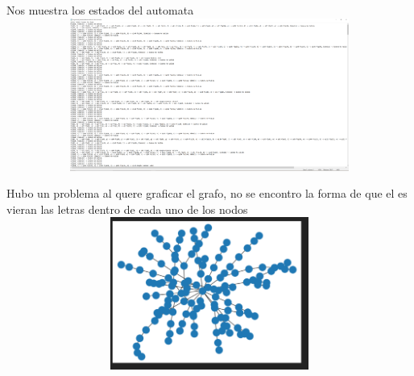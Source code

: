 \documentclass{article}
\begin{document}
\begin{flushleft}
Nos muestra los estados del automata
\includegraphics[width= 15cm, height= 5cm]{p3ar3.png}

Hubo un problema al quere graficar el grafo, no se encontro la forma de que el es vieran las letras dentro de cada uno de los nodos 
\includegraphics[width= 15cm, height= 5cm]{p3ar4.png}
\end{flushleft}
\end{document}
